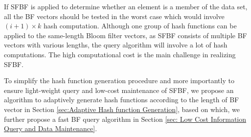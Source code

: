 \documentclass[10pt,journal,compsoc]{IEEEtran}
\begin{document}
If SFBF is applied to determine whether an element  is  a member of the data set, all the BF vectors should be tested in the worst case which would involve $(i+1) \times k$ hash computation. Although one group of hash functions can be applied to the same-length Bloom filter vectors, as SFBF consists of multiple BF vectors with various lengths, the query algorithm will involve a lot of hash computations. The high computational cost is the main challenge in realizing SFBF.




To simplify the hash function generation procedure and more importantly to ensure light-weight query and low-cost maintenance of  SFBF, we propose an algorithm to adaptively generate hash functions according to the length of BF vector  in Section \ref{sec:Adaptive Hash function Generation}, based on which, we further propose a fast BF query algorithm in Section \ref{sec: Low Cost Information Query and Data Maintenance}.





\end{document}
